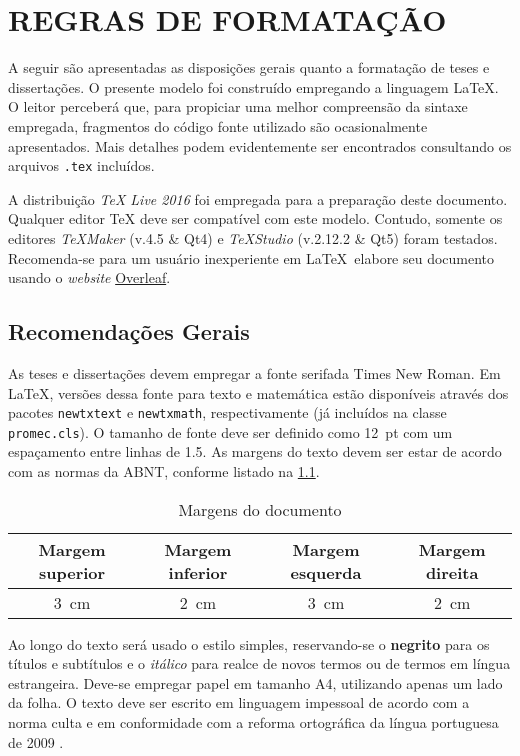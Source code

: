 \chapter{REGRAS DE FORMATAÇÃO}\label{Cap:fundamentacao-teorica}
A seguir são apresentadas as disposições gerais quanto a formatação de teses e dissertações. O presente modelo foi construído empregando a linguagem {\LaTeX}. O leitor perceberá que, para propiciar uma melhor compreensão da sintaxe empregada, fragmentos do código fonte utilizado são ocasionalmente apresentados. Mais detalhes podem evidentemente ser encontrados consultando os arquivos \texttt{.tex} incluídos.

A distribuição \textit{{\TeX} Live 2016} \citep{rahtz2016livetex} foi empregada para a preparação deste documento. Qualquer editor {\TeX} deve ser compatível com este modelo. Contudo, somente os editores \textit{{\TeX}Maker} (v.4.5 \& Qt4) e \textit{{\TeX}Studio} (v.2.12.2 \& Qt5) foram testados. Recomenda-se para um usuário inexperiente em \LaTeX\ elabore seu documento usando o \textit{website} \href{https://www.overleaf.com}{Overleaf}.

\section{Recomendações Gerais}
As teses e dissertações devem empregar a fonte serifada Times New Roman. Em \LaTeX, versões dessa fonte para texto e matemática estão disponíveis através dos pacotes \texttt{newtxtext} e \texttt{newtxmath}, respectivamente (já incluídos na classe \texttt{promec.cls}). O tamanho de fonte deve ser definido como \SI{12}{pt} com um espaçamento entre linhas de \num{1.5}. As margens do texto devem ser estar de acordo com as normas da ABNT, conforme listado na \cref{Tab:margens}.
\begin{table}[tb]
    \centering
    \caption{Margens do documento}
    \begin{tabular}{cccc}
        \toprule
        Margem superior & Margem inferior & Margem esquerda & Margem direita  \\
        \midrule
        \SI{3}{\centi\meter} & \SI{2}{\centi\meter} & \SI{3}{\centi\meter} & \SI{2}{\centi\meter} \\
        \bottomrule
    \end{tabular}
    \label{Tab:margens}
\end{table}

Ao longo do texto será usado o estilo simples, reservando-se o \textbf{negrito} para os títulos e subtítulos e o \textit{itálico} para realce de novos termos ou de termos em língua estrangeira. Deve-se empregar papel em tamanho A4, utilizando apenas um lado da folha. O texto deve ser escrito em linguagem impessoal de acordo com a norma culta e em conformidade com a reforma ortográfica da língua portuguesa de 2009 \citep{bechara2012moderna}.

